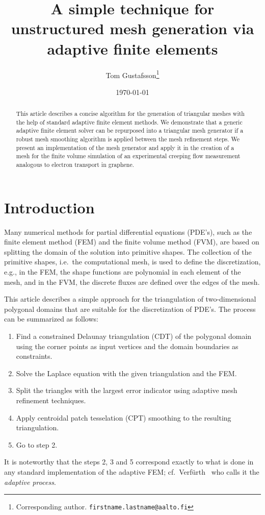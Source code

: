 \documentclass[12pt]{article}
\author{Tom Gustafsson\footnote{Corresponding author. \texttt{firstname.lastname@aalto.fi}}}
\date{\today}
\title{A simple technique for unstructured mesh generation via adaptive finite elements}
\begin{document}
\newcommand*\DNA{\textsc{dna}}

\newcommand*\Let[2]{\State #1 $\gets$ #2}
\algrenewcommand{}
\algrenewcommand{}

\maketitle

\begin{abstract}
  This article describes a concise algorithm for the generation of triangular
  meshes with the help of standard adaptive finite element methods.  We
  demonstrate that a generic adaptive finite element solver can be repurposed
  into a triangular mesh generator if a robust mesh smoothing algorithm is
  applied between the mesh refinement steps.  We present an implementation of
  the mesh generator and apply it in the creation of a mesh for the finite
  volume simulation of an experimental creeping flow measurement analogous to
  electron transport in graphene.
\end{abstract}

\section{Introduction}
\label{sec:orge4667b0}

Many numerical methods for partial differential equations (PDE's), such as the
finite element method (FEM) and the finite volume method (FVM), are based on
splitting the domain of the solution into primitive shapes.  The collection of
the primitive shapes, i.e.~the computational mesh, is used to define the
discretization, e.g., in the FEM, the shape functions are polynomial in each
element of the mesh, and in the FVM, the discrete fluxes are defined over the
edges of the mesh.

This article describes a simple approach for the triangulation of
two-dimensional polygonal domains that are suitable for the discretization of
PDE's.  The process can be summarized as follows:
\begin{enumerate}
\item Find a constrained Delaunay triangulation (CDT) of the polygonal domain
      using the corner points as input vertices and the domain boundaries
      as constraints.
\item Solve the Laplace equation with the given triangulation
      and the FEM.
\item Split
      the triangles with the largest error indicator
      using adaptive mesh refinement techniques.
\item Apply centroidal patch tesselation (CPT) smoothing to the resulting
  triangulation.
\item Go to step 2.
\end{enumerate}
It is noteworthy that the steps 2, 3 and 5 correspond exactly to what is done in
any standard implementation of the adaptive FEM;
cf.~Verf\"{u}rth~\cite{Verf_rth_2013} who calls it the \emph{adaptive process}.
\end{document}
